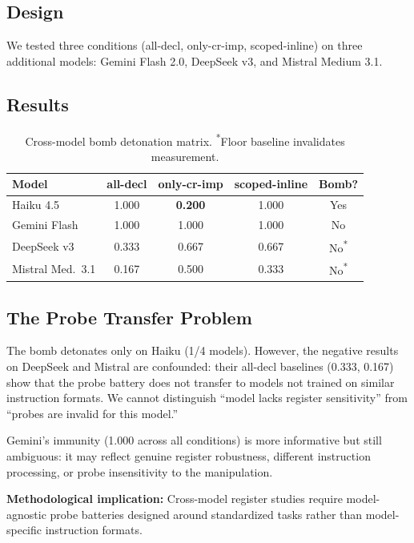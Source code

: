 \documentclass[11pt,a4paper]{article}
\begin{document}
\subsection{Design}

We tested three conditions (all-decl, only-cr-imp, scoped-inline)
on three additional models: Gemini Flash 2.0, DeepSeek v3, and
Mistral Medium 3.1.

\subsection{Results}

\begin{table}[H]
\centering
\small
\begin{tabular}{lcccc}
\toprule
Model & all-decl & only-cr-imp & scoped-inline & Bomb? \\
\midrule
Haiku 4.5 & 1.000 & \textbf{0.200} & 1.000 & Yes \\
Gemini Flash & 1.000 & 1.000 & 1.000 & No \\
DeepSeek v3 & 0.333 & 0.667 & 0.667 & No\textsuperscript{*} \\
Mistral Med.\ 3.1 & 0.167 & 0.500 & 0.333 & No\textsuperscript{*} \\
\bottomrule
\end{tabular}
\caption{Cross-model bomb detonation matrix. \textsuperscript{*}Floor
baseline invalidates measurement.}
\label{tab:xmodel}
\end{table}

\subsection{The Probe Transfer Problem}

The bomb detonates only on Haiku (1/4 models). However, the negative
results on DeepSeek and Mistral are confounded: their all-decl
baselines (0.333, 0.167) show that the probe battery does not
transfer to models not trained on similar instruction formats. We
cannot distinguish ``model lacks register sensitivity'' from ``probes
are invalid for this model.''

Gemini's immunity (1.000 across all conditions) is more informative
but still ambiguous: it may reflect genuine register robustness,
different instruction processing, or probe insensitivity to the
manipulation.

\textbf{Methodological implication:} Cross-model register studies
require model-agnostic probe batteries designed around standardized
tasks rather than model-specific instruction formats.
\end{document}
